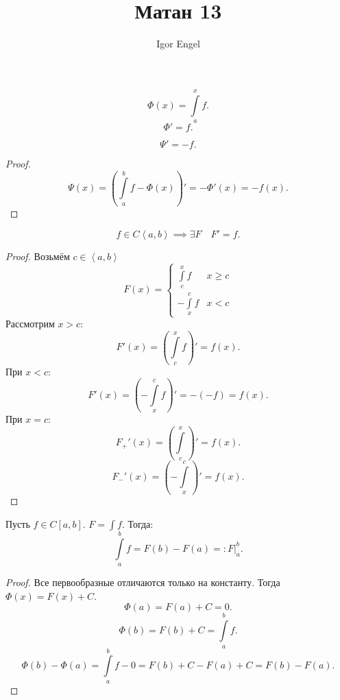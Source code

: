 \documentclass[11pt, oneside]{article}   	%
\title{Матан 13}
\author{Igor Engel}
\date{}
\begin{document}
\maketitle
\section{}
\begin{theorem}
    \[ \Phi(x) = \int\limits_{a}^{x} f  .\]
    \[ \Phi' = f .\] 
\end{theorem}
   \begin{tlemma}
       \[ \Psi' = -f .\]
       \begin{proof}
           \[ \Psi(x) = \left( \int\limits_{a}^{b} f - \Phi(x)  \right)' = -\Phi'(x) = -f(x)  .\]
       \end{proof}
   \end{tlemma}
   \begin{tlemma}
       \[ f\in C\left<a, b\right> \implies \exists{F}\quad F' = f .\]
      \begin{proof}
          Возьмём $c\in \left<a, b\right>$ 
           \begin{equation*}
               F(x) = \begin{cases}
                   \int\limits_{c}^{x} f & x \ge c\\
                   -\int\limits_{x}^{c} f & x < c 
               \end{cases}
            \end{equation*}
            Рассмотрим $x > c$:
            \[ F'(x) = \left( \int\limits_{c}^{x} f  \right)' = f(x) .\]
            При $x < c$:
            \[ F'(x) = \left( -\int\limits_{x}^{c} f  \right)' = -(-f) = f(x) .\]
            При $x=c$:
            \[ F_{+}'(x) = \left( \int\limits_{c}^{x}   \right)' = f(x).\] 
            \[ F_{-}'(x) = \left( -\int\limits_{x}^{c}   \right)' = f(x)  .\] 
      \end{proof} 
   \end{tlemma}
   \begin{theorem}
       Пусть $f\in C\left[a, b\right]$. $F = \int f$. Тогда:
       \[ \int\limits_{a}^{b} f = F(b) - F(a) =: \left. F\right|_{a}^{b}  .\]
        \begin{proof}
            Все первообразные отличаются только на константу. Тогда $\Phi(x) = F(x) + C$.\\
            \[ \Phi(a) = F(a) + C = 0.\]
            \[ \Phi(b) = F(b) + C = \int\limits_{a}^{b} f .\]
            \[ \Phi(b) - \Phi(a) = \int\limits_{a}^{b} f - 0 = F(b) + C - F(a) + C = F(b) - F(a)  .\] 
        \end{proof}
   \end{theorem}
\end{document}
